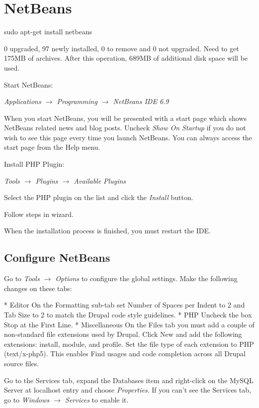 \documentclass[ebook,10pt,twoside,openright]{memoir}
\begin{document}
\section{NetBeans}

\begin{squashboxcommand}
sudo apt-get install netbeans
\end{squashboxcommand}

0 upgraded, 97 newly installed, 0 to remove and 0 not upgraded.
Need to get 175MB of archives.
After this operation, 689MB of additional disk space will be used.

Start NetBeans:

\emph{Applications $\rightarrow$ Programming $\rightarrow$ NetBeans IDE 6.9}

When you start NetBeans, you will be presented with a start page which shows NetBeans related news and blog posts. Uncheck \emph{Show On Startup} if you do not wish to see this page every time you launch NetBeans. You can always access the start page from the Help menu.

Install PHP Plugin:

\emph{Tools $\rightarrow$ Plugins $\rightarrow$ Available Plugins}

Select the PHP plugin on the list and click the \emph{Install} button.

Follow steps in wizard.

When the installation process is finished, you must restart the IDE.

\subsection{Configure NetBeans}

Go to \emph{Tools $\rightarrow$ Options} to configure the global settings. Make the following changes on these tabs:

    * Editor On the Formatting sub-tab set Number of Spaces per Indent to 2 and Tab Size to 2 to match the Drupal code style guidelines.
    * PHP Uncheck the box Stop at the First Line.
    * Miscellaneous On the Files tab you must add a couple of non-standard file extensions used by Drupal. Click New and add the following extensions: install, module, and profile. Set the file type of each extension to PHP (text/x-php5). This enables Find usages and code completion across all Drupal source files.

Go to the Services tab, expand the Databases item and right-click on the MySQL Server at localhost entry and choose \emph{Properties}. If you can’t see the Services tab, go to \emph{Windows $\rightarrow$ Services} to enable it.
\end{document}
